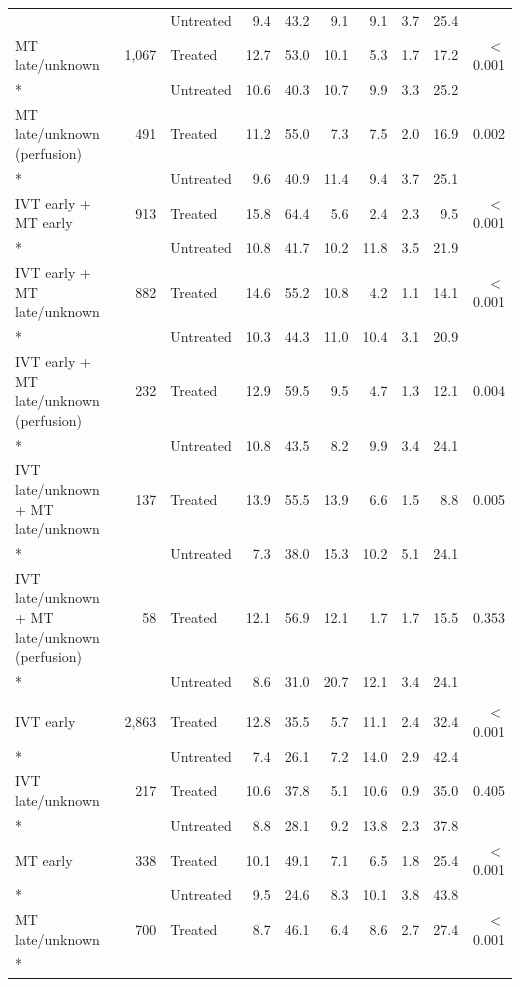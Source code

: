 \begin{landscape}
\begin{longtable}{p{5.6cm}rlrrrrrrr}
 & & Untreated & 9.4 & 43.2 & 9.1 & 9.1 & 3.7 & 25.4 & \\[2pt]
MT late/unknown & 1,067 & Treated & 12.7 & 53.0 & 10.1 & 5.3 & 1.7 & 17.2 & $<$0.001 \\*
 & & Untreated & 10.6 & 40.3 & 10.7 & 9.9 & 3.3 & 25.2 & \\[2pt]
MT late/unknown (perfusion) & 491 & Treated & 11.2 & 55.0 & 7.3 & 7.5 & 2.0 & 16.9 & 0.002 \\*
 & & Untreated & 9.6 & 40.9 & 11.4 & 9.4 & 3.7 & 25.1 & \\[2pt]
IVT early + MT early & 913 & Treated & 15.8 & 64.4 & 5.6 & 2.4 & 2.3 & 9.5 & $<$0.001 \\*
 & & Untreated & 10.8 & 41.7 & 10.2 & 11.8 & 3.5 & 21.9 & \\[2pt]
IVT early + MT late/unknown & 882 & Treated & 14.6 & 55.2 & 10.8 & 4.2 & 1.1 & 14.1 & $<$0.001 \\*
 & & Untreated & 10.3 & 44.3 & 11.0 & 10.4 & 3.1 & 20.9 & \\[2pt]
IVT early + MT late/unknown (perfusion) & 232 & Treated & 12.9 & 59.5 & 9.5 & 4.7 & 1.3 & 12.1 & 0.004 \\*
 & & Untreated & 10.8 & 43.5 & 8.2 & 9.9 & 3.4 & 24.1 & \\[2pt]
IVT late/unknown + MT late/unknown & 137 & Treated & 13.9 & 55.5 & 13.9 & 6.6 & 1.5 & 8.8 & 0.005 \\*
 & & Untreated & 7.3 & 38.0 & 15.3 & 10.2 & 5.1 & 24.1 & \\[2pt]
IVT late/unknown + MT late/unknown (perfusion) & 58 & Treated & 12.1 & 56.9 & 12.1 & 1.7 & 1.7 & 15.5 & 0.353 \\*
 & & Untreated & 8.6 & 31.0 & 20.7 & 12.1 & 3.4 & 24.1 & \\[2pt]
\addlinespace
\multicolumn{10}{l}{\textbf{NIHSS 21--25}}\\
IVT early & 2,863 & Treated & 12.8 & 35.5 & 5.7 & 11.1 & 2.4 & 32.4 & $<$0.001 \\*
 & & Untreated & 7.4 & 26.1 & 7.2 & 14.0 & 2.9 & 42.4 & \\[2pt]
IVT late/unknown & 217 & Treated & 10.6 & 37.8 & 5.1 & 10.6 & 0.9 & 35.0 & 0.405 \\*
 & & Untreated & 8.8 & 28.1 & 9.2 & 13.8 & 2.3 & 37.8 & \\[2pt]
MT early & 338 & Treated & 10.1 & 49.1 & 7.1 & 6.5 & 1.8 & 25.4 & $<$0.001 \\*
 & & Untreated & 9.5 & 24.6 & 8.3 & 10.1 & 3.8 & 43.8 & \\[2pt]
MT late/unknown & 700 & Treated & 8.7 & 46.1 & 6.4 & 8.6 & 2.7 & 27.4 & $<$0.001 \\*

\end{longtable}
\end{landscape}
